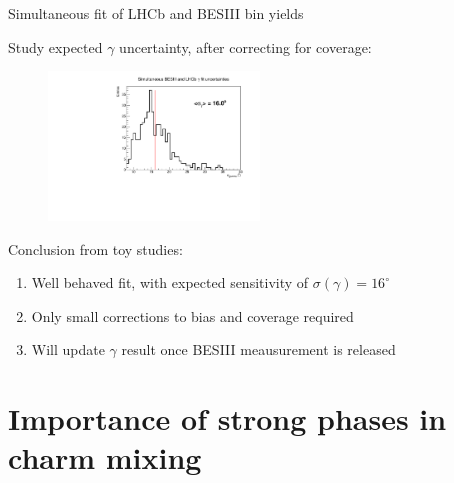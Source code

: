 \documentclass[xcolor={dvipsnames}]{beamer}
\begin{document}
\begin{frame}{Simultaneous fit of LHCb and BESIII bin yields}
  \begin{center}
    \large Study expected $\gamma$ uncertainty, after correcting for coverage:
  \end{center}
  \vspace{-0.3cm}
  \begin{figure}[htb]
    \centering
    \includegraphics[width=0.5\textwidth]{Plots/Gamma_SimultaneousFit_err.pdf}
  \end{figure}
  \vspace{-0.4cm}
  {\large Conclusion from toy studies:}
  \vspace{-0.0cm}
  \begin{enumerate}
    \item{Well behaved fit, with expected sensitivity of $\sigma(\gamma) = 16^\circ$}
    \item{Only small corrections to bias and coverage required}
    \item{Will update $\gamma$ result once BESIII meausurement is released}
  \end{enumerate}
\end{frame}

\section{Importance of strong phases in charm mixing}
\end{document}
